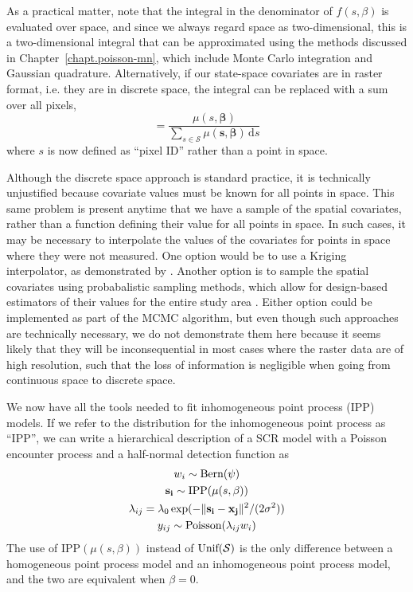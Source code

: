 As a practical matter, note that the integral in the
denominator of $f(s, \beta)$ is evaluated over space, and since we always regard
space as two-dimensional, this is a two-dimensional integral that can
be approximated using the methods discussed in
Chapter~\ref{chapt.poisson-mn}, which include
Monte Carlo integration and Gaussian quadrature. Alternatively, if
our state-space covariates are in raster format, i.e. they are
in discrete space, the integral can be replaced with a sum over
all pixels,
\begin{equation}
[\mathbf{s}, \bm{\beta}] = \frac{\mu(s, \bm{\beta})}{\sum_{s \in \mathcal{S}} \mu(\mathbf{s}, \bm{\beta})\, \mathrm{d}s}
\label{eq.pdf.dipp.d}
\end{equation}
where $s$ is now defined as ``pixel ID'' rather than a point in space.

Although the discrete space approach is standard practice, it is
technically unjustified because covariate values must be known for all
points in space. This same problem is present anytime that we have a
sample of the spatial covariates, rather than a function defining
their value for all points in space. In such cases, it may be necessary to
interpolate the values of the covariates for points in space where
they were not measured. One option would be to use a Kriging
interpolator, as demonstrated by \citet{rathbun:1996}. Another option
is to sample the spatial covariates using probabalistic sampling
methods, which allow for design-based estimators of their values for
the entire study area \citep{rathbun_etal:2007}. Either option could
be implemented as part of the MCMC algorithm, but even though such
approaches are technically necessary, we do not demonstrate them here
because it seems likely that they will be inconsequential in most
cases where the raster data are of high resolution, such that the loss
of information is negligible when going from continuous space to
discrete space.

We now have all the tools needed to fit inhomogeneous point process
(IPP) models. If we refer to the distribution for the
inhomogeneous point process as ``IPP'', we can write a
hierarchical description of a SCR model with a Poisson encounter process and
a half-normal detection function as
\begin{gather*}
w_i \sim \mbox{Bern}(\psi) \\
{\bf s_i} \sim \mbox{IPP}(\mu(s,\beta)) \\
\lambda_{ij} = \lambda_0 \exp(-\|{\bf s_i} - {\bf x_{j}}\|^2/(2\sigma^2)) \\
y_{ij} \sim \mbox{Poisson}(\lambda_{ij} w_i)
\end{gather*}
The use of $\mbox{IPP}(\mu(s, \beta))$ instead of
$\mbox{Unif}(\cal{S})$ is the only difference between a homogeneous
point process model and an inhomogeneous point process model, and the
two are equivalent when $\beta=0$.

